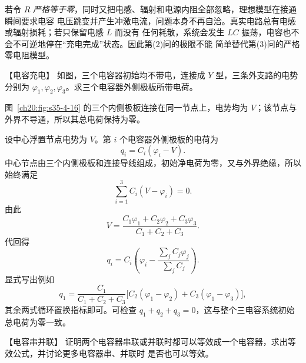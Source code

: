 {\begin{xesolution}
若令 $R$ \emph{严格等于零}，同时又把电感、辐射和电源内阻全部忽略，理想模型在接通瞬间要求电容
电压跳变并产生冲激电流，问题本身不再自洽。真实电路总有电感或辐射损耗；若只保留电感 $L$ 而没有
任何耗散，系统会发生 $LC$ 振荡，电容也不会不可逆地停在“充电完成”状态。因此第(2)问的极限不能
简单替代第(3)问的严格零电阻模型。
\end{xesolution}



\begin{origexamplebox}{【电容充电】}\label{ch20:ex:s35-4-9}
如图，三个电容器初始均不带电，连接成 $Y$ 型，三条外支路的电势分别为
$\varphi_1,\varphi_2,\varphi_3$。求三个电容器外侧极板所带电荷。
\par\noindent\begin{minipage}{\linewidth}
\yCapacitorFigure
{}\label{ch20:fig:s35-4-16}
\end{minipage}\par\medskip
\end{origexamplebox}\par\nopagebreak[4]

图~\ref{ch20:fig:s35-4-16} 的三个内侧极板连接在同一节点上，电势均为 $V$；该节点与外界不导通，所以其总电荷保持为零。


\begin{xesolution}
\ThAFloatingNode

设中心浮置节点电势为 $V$。第 $i$ 个电容器外侧极板的电荷为
\[
 q_i=C_i(\varphi_i-V).
\]
中心节点由三个内侧极板和连接导线组成，初始净电荷为零，又与外界绝缘，所以始终满足
\[
 \sum_{i=1}^3C_i(V-\varphi_i)=0.
\]
由此
\[
 \boxed{V=\frac{C_1\varphi_1+C_2\varphi_2+C_3\varphi_3}
 {C_1+C_2+C_3}}.
\]
代回得
\[
 \boxed{q_i=C_i\left(\varphi_i-
 \frac{\sum_jC_j\varphi_j}{\sum_jC_j}\right)}.
\]
显式写出例如
\[
 q_1=\frac{C_1}{C_1+C_2+C_3}
 \bigl[C_2(\varphi_1-\varphi_2)+C_3(\varphi_1-\varphi_3)\bigr],
\]
其余两式循环置换指标即可。可检查 $q_1+q_2+q_3=0$，这与整个三电容系统初始总电荷为零一致。
\end{xesolution}



\begin{origexamplebox}{【电容串并联】}\label{ch20:ex:s35-4-10}
证明两个电容器串联或并联时都可以等效成一个电容器，求出等效公式，并讨论更多电容器串、并联时
是否也可以等效。

\ThQCapNetworks
\end{origexamplebox}\par\nopagebreak[4]

}
